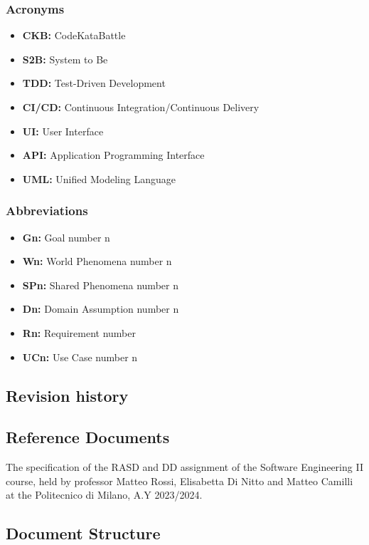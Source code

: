 \documentclass{article}
\begin{document}
\subsubsection{Acronyms}

\begin{itemize}
    \item \textbf{CKB:} CodeKataBattle
    \item \textbf{S2B:} System to Be
    \item \textbf{TDD:} Test-Driven Development
    \item \textbf{CI/CD:} Continuous Integration/Continuous Delivery
    \item \textbf{UI:} User Interface
    \item \textbf{API:} Application Programming Interface
    \item \textbf{UML:} Unified Modeling Language
\end{itemize}

\subsubsection{Abbreviations}

\begin{itemize}
    \item \textbf{Gn:} Goal number n
    \item \textbf{Wn:} World Phenomena number n
    \item \textbf{SPn:} Shared Phenomena number n
    \item \textbf{Dn:} Domain Assumption number n
    \item \textbf{Rn:} Requirement number 
    \item \textbf{UCn:} Use Case number n
\end{itemize}

\subsection{Revision history}
\subsection{Reference Documents}

The specification of the RASD and DD assignment of the Software
Engineering II course, held by professor Matteo Rossi, Elisabetta Di Nitto and
Matteo Camilli at the Politecnico di Milano, A.Y 2023/2024.

\subsection{Document Structure}
\end{document}
